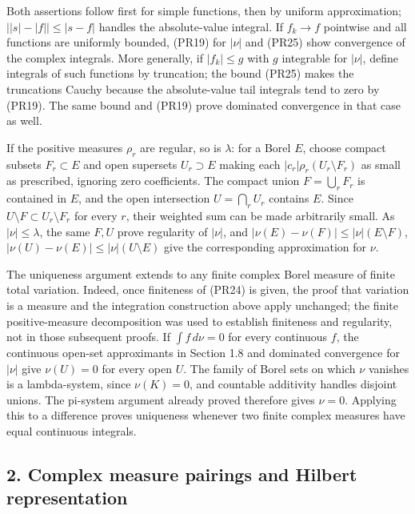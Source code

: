 \documentclass[
  11pt,
]{article}
\begin{document}
Both assertions follow first for simple functions, then by uniform
approximation; \(\big||s|-|f|\big|\leq|s-f|\) handles the absolute-value
integral. If \(f_k\to f\) pointwise and all functions are uniformly
bounded, (PR19) for \(|\nu|\) and (PR25) show convergence of the complex
integrals. More generally, if \(|f_k|\leq g\) with \(g\) integrable for
\(|\nu|\), define integrals of such functions by truncation; the bound
(PR25) makes the truncations Cauchy because the absolute-value tail
integrals tend to zero by (PR19). The same bound and (PR19) prove
dominated convergence in that case as well.

If the positive measures \(\rho_r\) are regular, so is \(\lambda\): for
a Borel \(E\), choose compact subsets \(F_r\subset E\) and open
supersets \(U_r\supset E\) making each \(|c_r|\rho_r(U_r\setminus F_r)\)
as small as prescribed, ignoring zero coefficients. The compact union
\(F=\bigcup_rF_r\) is contained in \(E\), and the open intersection
\(U=\bigcap_rU_r\) contains \(E\). Since
\(U\setminus F\subset U_r\setminus F_r\) for every \(r\), their weighted
sum can be made arbitrarily small. As \(|\nu|\leq\lambda\), the same
\(F,U\) prove regularity of \(|\nu|\), and
\(|\nu(E)-\nu(F)|\leq|\nu|(E\setminus F)\),
\(|\nu(U)-\nu(E)|\leq|\nu|(U\setminus E)\) give the corresponding
approximation for \(\nu\).

The uniqueness argument extends to any finite complex Borel measure of
finite total variation. Indeed, once finiteness of (PR24) is given, the
proof that variation is a measure and the integration construction above
apply unchanged; the finite positive-measure decomposition was used to
establish finiteness and regularity, not in those subsequent proofs. If
\(\int f\,d\nu=0\) for every continuous \(f\), the continuous open-set
approximants in Section 1.8 and dominated convergence for \(|\nu|\) give
\(\nu(U)=0\) for every open \(U\). The family of Borel sets on which
\(\nu\) vanishes is a lambda-system, since \(\nu(K)=0\), and countable
additivity handles disjoint unions. The pi-system argument already
proved therefore gives \(\nu=0\). Applying this to a difference proves
uniqueness whenever two finite complex measures have equal continuous
integrals.

\subsection{2. Complex measure pairings and Hilbert
representation}\label{complex-measure-pairings-and-hilbert-representation}
\end{document}
